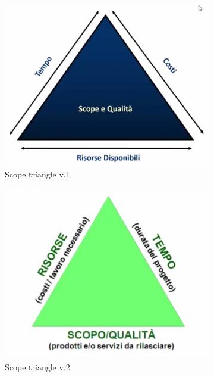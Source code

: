 \begin{figure}[H]
	\centering
	\begin{subfigure}{.3\textwidth}
		\centering
		\includegraphics[width=\linewidth]{document/img/triangle.PNG}
		\caption{Scope triangle v.1}
	\end{subfigure}%
	\begin{subfigure}{.3\textwidth}
		\centering
		\includegraphics[width=\linewidth]{document/img/triangle2.PNG}
		\caption{Scope triangle v.2}
	\end{subfigure}%
	\begin{subfigure}{.3\textwidth}

\end{subfigure}
\end{figure}
